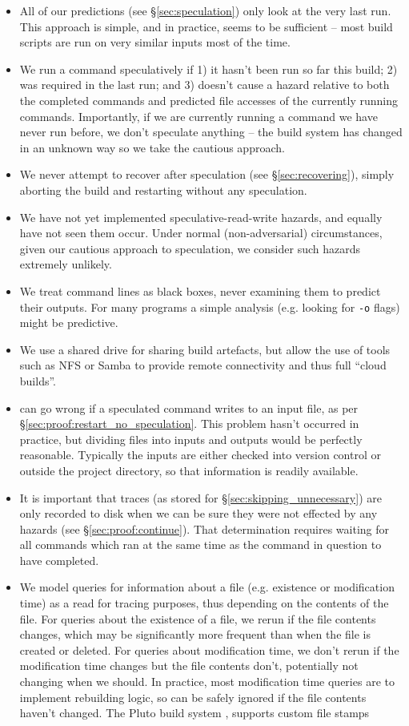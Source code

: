 \begin{itemize}
\item All of our predictions (see \S\ref{sec:speculation}) only look at the very last run. This approach is simple, and in practice, seems to be sufficient -- most build scripts are run on very similar inputs most of the time.
\item We run a command speculatively if 1) it hasn't been run so far this build; 2) was required in the last run; and 3) doesn't cause a hazard relative to both the completed commands and predicted file accesses of the currently running commands. Importantly, if we are currently running a command we have never run before, we don't speculate anything -- the build system has changed in an unknown way so we take the cautious approach.
\item We never attempt to recover after speculation (see \S\ref{sec:recovering}), simply aborting the build and restarting without any speculation.
\item We have not yet implemented speculative-read-write hazards, and equally have not seen them occur. Under normal (non-adversarial) circumstances, given our cautious approach to speculation, we consider such hazards extremely unlikely.
\item We treat command lines as black boxes, never examining them to predict their outputs. For many programs a simple analysis (e.g. looking for \texttt{-o} flags) might be predictive.
\item We use a shared drive for sharing build artefacts, but allow the use of tools such as NFS or Samba to provide remote connectivity and thus full ``cloud builds''.
\item \Rattle can go wrong if a speculated command writes to an input file, as per \S\ref{sec:proof:restart_no_speculation}. This problem hasn't occurred in practice, but dividing files into inputs and outputs would be perfectly reasonable. Typically the inputs are either checked into version control or outside the project directory, so that information is readily available.
\item It is important that traces (as stored for \S\ref{sec:skipping_unnecessary}) are only recorded to disk when we can be sure they were not effected by any hazards (see \S\ref{sec:proof:continue}). That determination requires waiting for all commands which ran at the same time as the command in question to have completed.
\item We model queries for information about a file (e.g. existence or modification time) as a read for tracing purposes, thus depending on the contents of the file. For queries about the existence of a file, we rerun if the file contents changes, which may be significantly more frequent than when the file is created or deleted. For queries about modification time, we don't rerun if the modification time changes but the file contents don't, potentially not changing when we should. In practice, most modification time queries are to implement rebuilding logic, so can be safely ignored if the file contents haven't changed.  The Pluto build system \cite{erdweg2015sound}, supports custom file stamps

\end{itemize}
